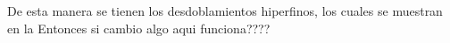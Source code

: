 \documentclass[../Main.tex]{subfiles}
\begin{document}
De esta manera se tienen los desdoblamientos hiperfinos, los cuales se muestran en la 
Entonces si cambio algo aqui funciona????
\end{document}
